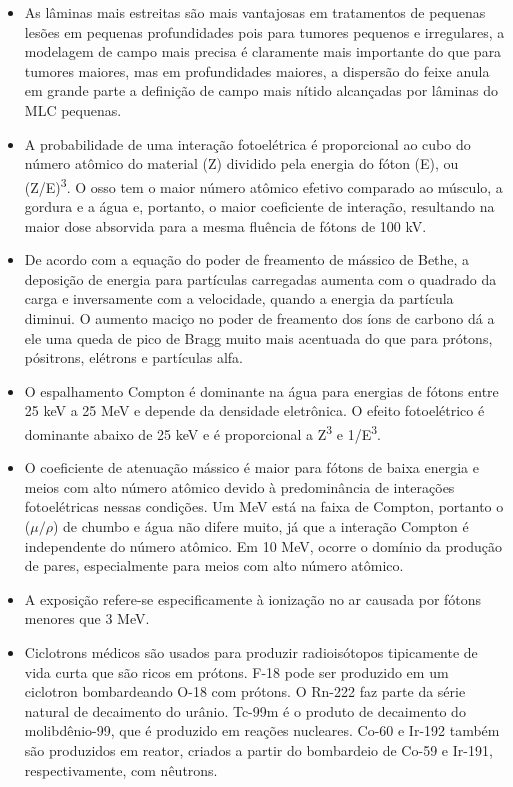 \documentclass[11pt,a4paper]{article}
\newcounter{exemplo}
\begin{document}
\begin{exemplo}[Física]
\begin{itemize}
        \item As lâminas mais estreitas são mais vantajosas em tratamentos de pequenas lesões em pequenas profundidades pois para tumores pequenos e irregulares, a modelagem de campo mais precisa é claramente mais importante do que para tumores maiores, mas em profundidades maiores, a dispersão do feixe anula em grande parte a definição de campo mais nítido alcançadas por lâminas do MLC pequenas.
        
        \item A probabilidade de uma interação fotoelétrica é proporcional ao cubo do número atômico do material (Z) dividido pela energia do fóton (E), ou (Z/E)\textsuperscript{3}. O osso tem o maior número atômico efetivo comparado ao músculo, a gordura e a água e, portanto, o maior coeficiente de interação, resultando na maior dose absorvida para a mesma fluência de fótons de 100 kV.
        
        \item De acordo com a equação do poder de freamento de mássico de Bethe, a deposição de energia para partículas carregadas aumenta com o quadrado da carga e inversamente com a velocidade, quando a energia da partícula diminui. O aumento maciço no poder de freamento dos íons de carbono dá a ele uma queda de pico de Bragg muito mais acentuada do que para prótons, pósitrons, elétrons e partículas alfa.
        
        \item O espalhamento Compton é dominante na água para energias de fótons entre 25 keV a 25 MeV e depende da densidade eletrônica. O efeito fotoelétrico é dominante abaixo de 25 keV e é proporcional a Z\textsuperscript{3} e 1/E\textsuperscript{3}.
        
        \item O coeficiente de atenuação mássico é maior para fótons de baixa energia e meios com alto número atômico devido à predominância de interações fotoelétricas nessas condições. Um MeV está na faixa de Compton, portanto o ($\mu/\rho$) de chumbo e água não difere muito, já que a interação Compton é independente do número atômico. Em 10 MeV, ocorre o domínio da produção de pares, especialmente para meios com alto número atômico.
        
        \item A exposição refere-se especificamente à ionização no ar causada por fótons menores que 3 MeV.
        
        \item Ciclotrons médicos são usados para produzir radioisótopos tipicamente de vida curta que são ricos em prótons. F-18 pode ser produzido em um ciclotron bombardeando O-18 com prótons. O Rn-222 faz parte da série natural de decaimento do urânio. Tc-99m é o produto de decaimento do molibdênio-99, que é produzido em reações nucleares. Co-60 e Ir-192 também são produzidos em reator, criados a partir do bombardeio de Co-59 e Ir-191, respectivamente, com nêutrons.
        

\end{itemize}
\end{exemplo}
\end{document}
